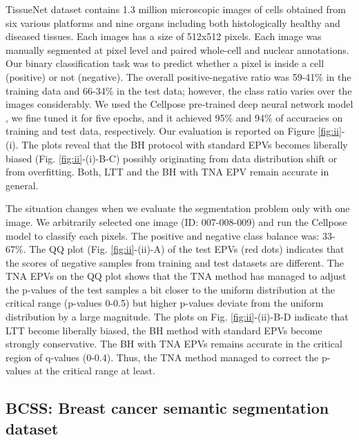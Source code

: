 \documentclass{article}
\begin{document}
TissueNet dataset contains 1.3 million microscopic images of cells obtained from six various platforms and nine organs including both histologically healthy and diseased tissues. Each images has a size of 512x512 pixels. Each image was manually segmented at pixel level and paired whole-cell and nuclear annotations. Our binary classification task was to predict whether a pixel is inside a cell (positive) or not (negative). The overall positive-negative ratio was 59-41\% in the training data and 66-34\% in the test data; however, the class ratio varies over the images considerably. We used the Cellpose pre-trained deep neural network model \cite{cellpose}, we fine tuned it for five epochs, and it achieved 95\% and 94\% of accuracies  on training and test data, respectively. Our evaluation is reported on Figure \ref{fig:ii}-(i). The plots reveal that the BH protocol with standard EPVs becomes liberally biased (Fig. \ref{fig:ii}-(i)-B-C) possibly originating from data distribution shift or from overfitting. Both, LTT and the BH with TNA EPV remain accurate in general. 

The situation changes when we evaluate the segmentation problem only with one image. We arbitrarily selected one image (ID: 007-008-009) and run the Cellpose model to classify each pixels. The positive and negative class balance was: 33-67\%. The QQ plot (Fig. \ref{fig:ii}-(ii)-A) of the test EPVs (red dots) indicates that the scores of negative samples from training and test datasets are different. The TNA EPVs on the QQ plot shows that the TNA method has managed to adjust the p-values of the test samples a bit closer to the uniform distribution at the critical range (p-values 0-0.5) but higher p-values deviate from the uniform distribution by a large magnitude. The plots on Fig. \ref{fig:ii}-(ii)-B-D indicate that LTT become liberally biased, the BH method with standard EPVs become strongly conservative. The BH with TNA EPVs remains accurate in the critical region of q-values (0-0.4). Thus, the TNA method managed to correct the p-values at the critical range at least. 






\subsection{BCSS: Breast cancer semantic segmentation dataset}
\end{document}
